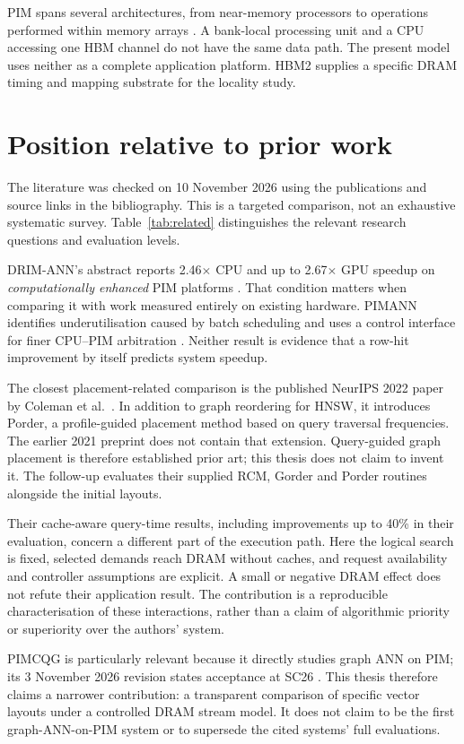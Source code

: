 \documentclass[11pt,a4paper]{report}
\begin{document}
PIM spans several architectures, from near-memory processors to operations performed within memory arrays \cite{primer}. A bank-local processing unit and a CPU accessing one HBM channel do not have the same data path. The present model uses neither as a complete application platform. HBM2 supplies a specific DRAM timing and mapping substrate for the locality study.

\section{Position relative to prior work}
The literature was checked on 10 November 2026 using the publications and source links in the bibliography. This is a targeted comparison, not an exhaustive systematic survey. Table~\ref{tab:related} distinguishes the relevant research questions and evaluation levels.



DRIM-ANN's abstract reports 2.46$\times$ CPU and up to 2.67$\times$ GPU speedup on \emph{computationally enhanced} PIM platforms \cite{drim}. That condition matters when comparing it with work measured entirely on existing hardware. PIMANN identifies underutilisation caused by batch scheduling and uses a control interface for finer CPU--PIM arbitration \cite{pimann}. Neither result is evidence that a row-hit improvement by itself predicts system speedup.

The closest placement-related comparison is the published NeurIPS 2022 paper by Coleman et al.~\cite{coleman}. In addition to graph reordering for HNSW, it introduces Porder, a profile-guided placement method based on query traversal frequencies. The earlier 2021 preprint does not contain that extension. Query-guided graph placement is therefore established prior art; this thesis does not claim to invent it. The follow-up evaluates their supplied RCM, Gorder and Porder routines alongside the initial layouts.

Their cache-aware query-time results, including improvements up to 40\% in their evaluation, concern a different part of the execution path. Here the logical search is fixed, selected demands reach DRAM without caches, and request availability and controller assumptions are explicit. A small or negative DRAM effect does not refute their application result. The contribution is a reproducible characterisation of these interactions, rather than a claim of algorithmic priority or superiority over the authors' system.

PIMCQG is particularly relevant because it directly studies graph ANN on PIM; its 3 November 2026 revision states acceptance at SC26 \cite{pimcqg}. This thesis therefore claims a narrower contribution: a transparent comparison of specific vector layouts under a controlled DRAM stream model. It does not claim to be the first graph-ANN-on-PIM system or to supersede the cited systems' full evaluations.
\end{document}
